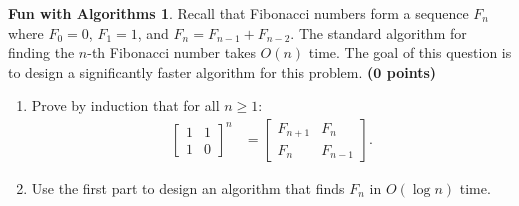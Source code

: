\documentclass{article}
\theoremstyle{definition}
\newtheorem*{fun}{Fun with Algorithms}
\newcommand{\grade}[1]{\hfill{\textbf{($\mathbf{#1}$ points)}}}
\begin{document}
\begin{fun}
Recall that Fibonacci numbers form a sequence $F_n$ where $F_0 = 0$, $F_1 = 1$, and $F_n = F_{n-1} + F_{n-2}$. 
The standard algorithm for finding the $n$-th Fibonacci number takes $O(n)$ time. The goal of this question is to design a significantly faster algorithm for this problem. \grade{0}
	\begin{enumerate}[label=(\alph*)]
		\item Prove by induction that for all $n \geq 1$: 
		\begin{align*}
			\begin{bmatrix}
				1 & 1 \\
				1 & 0
			\end{bmatrix}^n
			&= 	\begin{bmatrix}
				F_{n+1} & F_n \\
				F_n & F_{n-1}
			\end{bmatrix}.
		\end{align*}
		\item Use the first part to design an algorithm that finds $F_n$ in $O(\log{n})$ time. 
	\end{enumerate}	 
\end{fun}
\end{document}
